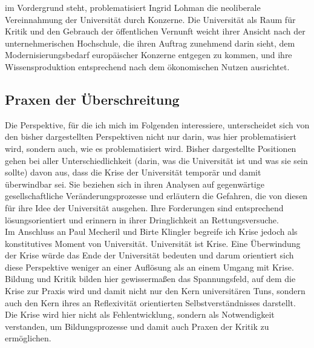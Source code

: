 im Vordergrund steht, problematisiert Ingrid Lohman\footnotemark
{} die neoliberale
Vereinnahmung der Universität durch Konzerne. Die Universität als Raum für
Kritik und den Gebrauch der öffentlichen Vernunft weicht ihrer Ansicht nach der
\glqq unternehmerischen Hochschule\grqq\footnotemark {}, die ihren Auftrag zunehmend darin sieht, dem
Modernisierungsbedarf europäischer Konzerne entgegen zu kommen, und ihre
Wissensproduktion entsprechend nach dem ökonomischen Nutzen ausrichtet. 
\newpage
\subsection{Praxen der Überschreitung}

Die Perspektive, für die ich mich im Folgenden interessiere, unterscheidet sich
von den bisher dargestellten Perspektiven nicht nur darin, was hier
problematisiert wird, sondern auch, wie es problematisiert wird. Bisher
dargestellte Positionen gehen bei aller Unterschiedlichkeit (darin, was die
Universität ist und was sie sein sollte) davon aus, dass die Krise der
Universität temporär und damit überwindbar sei. Sie beziehen sich in ihren
Analysen auf gegenwärtige gesellschaftliche Veränderungsprozesse und erläutern
die Gefahren, die von diesen für ihre Idee der Universität ausgehen. Ihre
Forderungen sind entsprechend lösungsorientiert und erinnern in ihrer
Dringlichkeit an Rettungsversuche.\\
Im Anschluss an Paul Mecheril und Birte Klingler begreife ich Krise jedoch als konstitutives Moment von
Universität. Universität ist Krise. Eine Überwindung der Krise würde das Ende
der Universität bedeuten und darum orientiert sich diese Perspektive weniger an
einer Auflösung als an einem Umgang mit Krise.\\
Bildung und Kritik bilden hier
gewissermaßen das Spannungsfeld, auf dem die Krise zur Praxis wird und damit
nicht nur den Kern universitären Tuns, sondern auch den Kern ihres an
Reflexivität orientierten Selbstverständnisses darstellt. Die Krise wird hier
nicht als Fehlentwicklung, sondern als Notwendigkeit verstanden, um
Bildungsprozesse und damit auch Praxen der Kritik zu ermöglichen.\\

